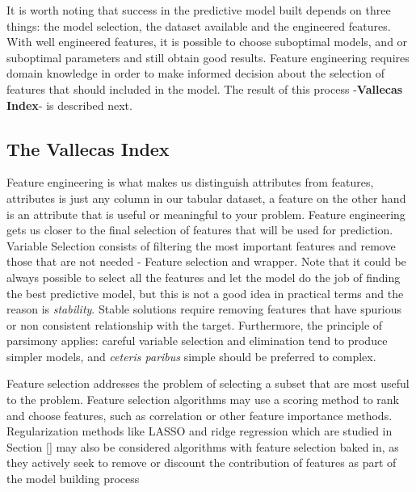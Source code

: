\documentclass[11pt]{article}
\begin{document}
It is worth noting that success in the predictive model built depends on three things: the model selection, the dataset available and the engineered features. With well engineered features, it is possible to choose suboptimal models, and or suboptimal parameters and still obtain good results. Feature engineering requires domain knowledge in order to make informed decision about the selection of features that should included in the model. The result of this process -\textbf{Vallecas Index}- is described next. 


\subsection{The Vallecas Index}
\label{sse:vs}
Feature engineering is what makes us distinguish attributes from features, attributes is just any column in our tabular dataset, a feature on the other hand is an attribute that is useful or meaningful to your problem. Feature engineering gets us closer to the final selection of features that will be used for prediction. 
Variable Selection consists of filtering the most important features and remove those that are not needed - Feature selection and wrapper.
Note that it could be always possible to select all the features and let the model do the job of finding the best predictive model, but this is not a good idea in practical terms and the reason is \emph{stability}. Stable solutions require removing features that have spurious or non consistent relationship with the target. Furthermore, the principle of parsimony applies: careful variable selection and elimination tend to produce simpler models, and \emph{ceteris paribus} simple should be preferred to complex.

Feature selection addresses the problem of selecting a subset that are most useful to the problem. Feature selection algorithms may use a scoring method to rank and choose features, such as correlation or other feature importance methods. Regularization methods like LASSO and ridge regression which are studied in Section \ref{} may also be considered algorithms with feature selection baked in, as they actively seek to remove or discount the contribution of features as part of the model building process
\end{document}
